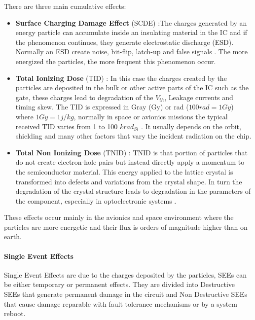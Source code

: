 {{{{{					There are three main cumulative effects:
					\begin{itemize}
						\item  \textbf{Surface Charging Damage Effect} (SCDE) :The charges generated by an energy particle can accumulate inside an insulating material in the IC and if the phenomenon continues, they generate electrostatic discharge (ESD). Normally an ESD create noise, bit-flip, latch-up and false signals . The more energized the particles, the more frequent this phenomenon occur.
						
						\item \textbf{Total Ionizing Dose} (TID) : In this case the charges created by the particles are deposited in the bulk or other active parts of the IC such as the gate, these charges lead to degradation of the $V_{th}$, Leakage currents and timing skew. The TID is expressed in Gray (Gy) or rad ($100rad=1Gy$) where $1Gy=1j/kg$, normally in space or avionics missions the typical received TID varies from 1 to 100 $krad_{Si}$ . It usually depends on the orbit, shielding and many other factors that vary the incident radiation on the chip.
						
						\item \textbf{Total Non Ionizing Dose} (TNID) : TNID is that portion of particles that do not create electron-hole pairs but instead directly apply a momentum to the semiconductor material. This energy applied to the lattice crystal is transformed into defects and variations from the crystal shape. In turn the degradation of the crystal structure leads to degradation in the parameters of the component, especially in optoelectronic systems . 
						
					\end{itemize}
					
					\vspace{1cm}
					
					These effects occur mainly in the avionics and space environment where the particles are more energetic and their flux is orders of magnitude higher than on earth.
					
				}%
				\paragraph{Single Event Effects}{
					Single Event Effects are due to the charges deposited by the particles, SEEs can be either temporary or permanent effects. They are divided into Destructive SEEs that generate permanent damage in the circuit and Non Destructive SEEs that cause damage reparable with fault tolerance mechanisms or by a system reboot.\\
					
}}}}}

